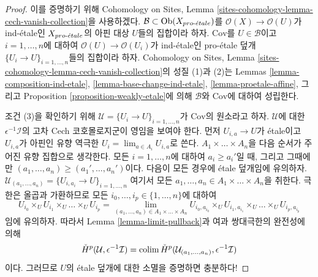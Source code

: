 \begin{proof}
이를 증명하기 위해 Cohomology on Sites, Lemma
\ref{sites-cohomology-lemma-cech-vanish-collection}을 사용하겠다.
$\mathcal{B} \subset \mathop{\mathrm{Ob}}\nolimits(X_{pro\text{-}\acute{e}tale})$를
$\mathcal{O}(X) \to \mathcal{O}(U)$가 ind-\'etale인 $X_{pro\text{-}\acute{e}tale}$의
아핀 대상 $U$들의 집합이라 하자. $\text{Cov}$를
$U \in \mathcal{B}$이고 $i = 1, \ldots, n$에 대하여
$\mathcal{O}(U) \to \mathcal{O}(U_i)$가 ind-\'etale인 pro-\'etale
덮개 $\{U_i \to U\}_{i = 1, \ldots, n}$들의 집합이라 하자.
Cohomology on Sites, Lemma
\ref{sites-cohomology-lemma-cech-vanish-collection}의 성질 (1)과 (2)는
Lemmas \ref{lemma-composition-ind-etale},
\ref{lemma-base-change-ind-etale}, \ref{lemma-proetale-affine}, 그리고
Proposition \ref{proposition-weakly-etale}에 의해
$\mathcal{B}$와 $\text{Cov}$에 대하여 성립한다.

\medskip\noindent
조건 (3)을 확인하기 위해
$\mathcal{U} = \{U_i \to U\}_{i = 1, \ldots, n}$가
$\text{Cov}$의 원소라고 하자. $\mathcal{U}$에 대한
$\epsilon^{-1}\mathcal{I}$의 고차 Cech 코호몰로지군이 영임을 보여야
한다. 먼저 $U_{i, a} \to U$가 \'etale이고 $U_{i, a}$가 아핀인 유향
역극한 $U_i = \lim_{a \in A_i} U_{i, a}$로 쓴다.
$A_1 \times \ldots \times A_n$을 다음 순서가 주어진 유향 집합으로
생각한다. 모든 $i = 1, \ldots, n$에 대하여 $a_i \geq a_i'$일 때,
그리고 그때에만
$(a_1, \ldots, a_n) \geq (a_1', \ldots, a_n')$이다.
다음이 모든 경우에 \'etale 덮개임에 유의하자.
$\mathcal{U}_{(a_1, \ldots, a_n)} = \{U_{i, a_i} \to U\}_{i = 1, \ldots, n}$
여기서 모든 $a_1, \ldots, a_n \in A_1 \times \ldots \times A_n$을
취한다. 극한은 올곱과 가환하므로 모든
$i_0, \ldots, i_p \in \{1, \ldots, n\}$에 대하여
$$
U_{i_0} \times_U U_{i_1} \times_U \ldots \times_U U_{i_p}
=
\lim_{(a_1, \ldots, a_n) \in A_1 \times \ldots \times A_n}
U_{i_0, a_{i_0}} \times_U
U_{i_1, a_{i_1}} \times_U \ldots \times_U U_{i_p, a_{i_p}}
$$
임에 유의하자. 따라서 Lemma \ref{lemma-limit-pullback}과 여과
쌍대극한의 완전성에 의해
$$
\check{H}^p(\mathcal{U}, \epsilon^{-1}\mathcal{I}) =
\mathop{\mathrm{colim}}\nolimits \check{H}^p(\mathcal{U}_{(a_1, \ldots, a_n)}, \epsilon^{-1}\mathcal{I}) 
$$
이다. 그러므로 $U$의 \'etale 덮개에 대한 소멸을 증명하면 충분하다!


\end{proof}
